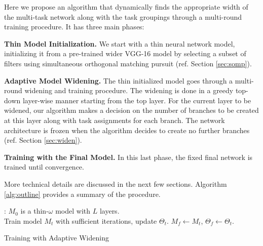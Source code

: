 \documentclass[10pt,twocolumn,letterpaper]{article}
\begin{document}
Here we propose an algorithm that dynamically finds the appropriate width of the multi-task network along with the task groupings through a multi-round training procedure. It has three main phases:

{\bf Thin Model Initialization.}
We start with a thin neural network model, initializing it from a pre-trained wider VGG-16 model by selecting a subset of filters using simultaneous orthogonal matching pursuit (ref. Section \ref{sec:somp}).   

{\bf Adaptive Model Widening.}
The thin initialized model goes through a multi-round widening and training procedure. The widening is done in a greedy top-down layer-wise manner starting from the top layer. For the current layer to be widened, our algorithm makes a decision on the number of branches to be created at this layer along with task assignments for each branch. The network architecture is frozen when the algorithm decides to create no further branches (ref. Section \ref{sec:widen}).   

{\bf Training with the Final Model.} In this last phase, the fixed final network is trained %
until convergence. %

More technical details are discussed in the next few sections. Algorithm \ref{alg:outline} provides a summary of the procedure. 

\begin{algorithm}[!t]\label{alg:outline} \small
	\SetInd{1ex}{1ex}
	: $M_0$ is a thin-$\omega$ model with $L$ layers. \\ 
Train model $M_t$ with sufficient iterations, update $\Theta_t$. 
$M_f \leftarrow M_t$, $\Theta_f \leftarrow \Theta_t$.  
\caption{Training with Adaptive Widening}
\end{algorithm}
\end{document}
